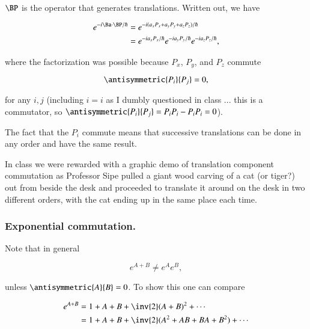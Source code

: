 $\BP$ is the operator that generates translations.  Written out, we have

\begin{equation}\label{eqn:qmTwoL11:50}
\begin{aligned}
e^{-i \Ba \cdot \BP/\hbar} 
&= e^{- i (a_x P_x + a_y P_y + a_z P_z)/\hbar} \\
&= e^{- i a_x P_x/\hbar}
e^{- i a_y P_y/\hbar}
e^{- i a_z P_z/\hbar},
\end{aligned}
\end{equation}

where the factorization was possible because $P_x$, $P_y$, and $P_z$ commute

\begin{equation}\label{eqn:qmTwoL11:70}
\antisymmetric{P_i}{P_j} = 0,
\end{equation}

for any $i, j$ (including $i = i$ as I dumbly questioned in class ... this is a  commutator, so $\antisymmetric{P_i}{P_j} = P_i P_i - P_i P_i = 0$).

The fact that the $P_i$ commute means that successive translations can be done in any order and have the same result.

In class we were rewarded with a graphic demo of translation component commutation as Professor Sipe pulled a giant wood carving of a cat (or tiger?) out from beside the desk and proceeded to translate it around on the desk in two different orders, with the cat ending up in the same place each time.

\subsubsection{Exponential commutation.}

Note that in general

\begin{equation}\label{eqn:qmTwoL11:90}
e^{A + B} \ne e^A e^B,
\end{equation}

unless $\antisymmetric{A}{B} = 0$.  To show this one can compare

\begin{equation}\label{eqn:qmTwoL11:110}
\begin{aligned}
e^{A + B} 
&= 1 + A + B + \inv{2}(A + B)^2 + \cdots \\
&= 1 + A + B + \inv{2}(A^2 + A B + BA + B^2) + \cdots \\
\end{aligned}
\end{equation}

